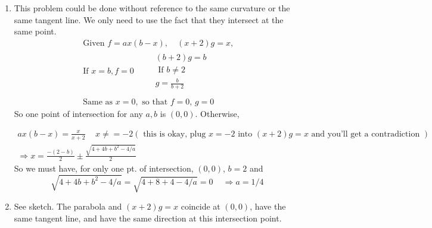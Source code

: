 \documentclass[twoside]{amsart}
\theoremstyle{plain}
\theoremstyle{definition}
\newcommand{\exercisehead}[1]
  {\smallskip
   \noindent{\small\bf Exercise #1.}}
\begin{document}
\exercisehead{9} 
\begin{enumerate}
\item This problem could be done without reference to the same curvature or the same tangent line.  We only need to use the fact that they intersect at the same point.  
\[
\begin{gathered}
  \text{ Given } f = ax(b-x), \quad (x+2)g = x, \\
  \text{ If } x = b, 
  f = 0 \quad \quad \, \begin{gathered}
    (b+2)g = b \\
    \text{ If } b \neq 2 \\
    g= \frac{b}{b+2} 
\end{gathered} \\
  \quad \\
  \text{ Same as } x=0, \text{ so that } f = 0, \, g= 0
\end{gathered}
\]
So one point of intersection for any $a,b$ is $(0,0)$.  Otherwise, 

\[
\begin{gathered}
  ax(b-x) = \frac{x}{x+2} \quad \, x \neq = -2 (\text{ this is okay, plug $x=-2$ into $(x+2)g=x$ and you'll get a contradiction }) \\
  \Longrightarrow x = \frac{ -(2-b)}{2} \pm \frac{ \sqrt{ 4 + 4b + b^2 - 4/a}}{2} 
\end{gathered}
\]
So we must have, for only one pt. of intersection, $(0,0)$, $\boxed{ b=2 }$ and 
\[
\sqrt{ 4 + 4b+ b^2 - 4/a } = \sqrt{ 4 + 8 + 4 - 4/a} = 0 \quad \, \Longrightarrow \boxed{ a =1/4 }
\] 
\item See sketch.  The parabola and $(x+2)g=x$ coincide at $(0,0)$, have the same tangent line, and have the same direction at this intersection point.  
\end{enumerate}
\end{document}
